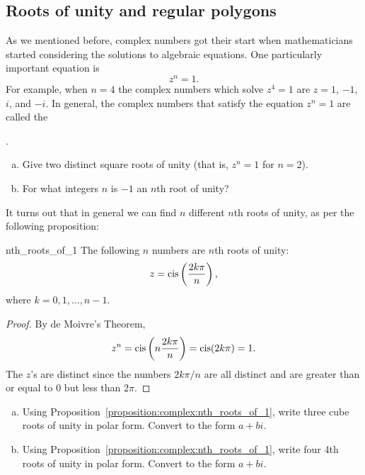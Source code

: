 \subsection{Roots of unity and regular polygons}\label {sec:RootsOfUnity}
As we mentioned before, complex numbers got their start when mathematicians started considering the solutions to algebraic  equations. One particularly important equation is
\[z^{n}=1.\]
For example, when $n=4$ the complex numbers which solve $z^4=1$ are $z=1$, $-1$, $i$, and $-i$. In general, the complex numbers that satisfy the
equation $z^{n}=1$ are called the {.

\begin{exercise}{48}
\begin{enumerate}[(a)]
\item
Give two distinct square roots of unity (that is, $z^n = 1$ for $n=2$).
\item
For what integers $n$ is $-1$ an $n$th root of unity?
\end{enumerate}
\end{exercise}

It turns out that in general we can find $n$ different $n$th roots of unity, as per the following proposition:

\begin{prop}{nth_roots_of_1} The following $n$ numbers are $n$th roots of unity:
\[
z=\operatorname{cis}\left(\frac{2k\pi}{n}\right),\]
 where $k=0,1,\ldots,n-1$. \end{prop}

\begin{proof} By de Moivre's Theorem, \[
z^{n}=\operatorname{cis}\left(n\frac{2k\pi}{n}\right)=\operatorname{cis}(2k\pi)=1.\]
 The $z$'s are distinct since the numbers $2k\pi/n$ are all distinct 
and are greater than or equal to 0 but less than $2\pi$. 
\end{proof}

\begin{exercise}{49}
\begin{enumerate}[(a)]
\item
Using Proposition~\ref{proposition:complex:nth_roots_of_1}, write three cube roots of unity in polar form. Convert to the form $a + bi$.
\item
Using Proposition~\ref{proposition:complex:nth_roots_of_1}, write four 4th roots of unity in polar form. Convert to the form $a+bi$.
\end{enumerate}
\end{exercise}

}
